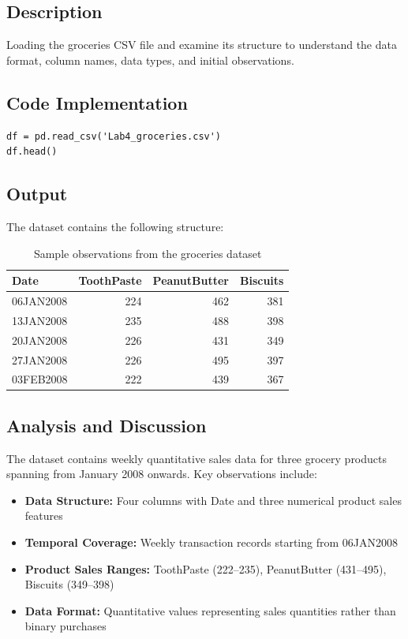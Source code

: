 \documentclass[12pt,a4paper]{article}
\begin{document}
\subsection{Description}
Loading the groceries CSV file and examine its structure to understand the data format, column names, data types, and initial observations.

\subsection{Code Implementation}

\begin{lstlisting}
df = pd.read_csv('Lab4_groceries.csv')
df.head()
\end{lstlisting}

\subsection{Output}
The dataset contains the following structure:
\begin{table}[H]
\centering
\small
\begin{tabular}{l|r|r|r}
\toprule
\textbf{Date} & \textbf{ToothPaste} & \textbf{PeanutButter} & \textbf{Biscuits} \\
\midrule
06JAN2008 & 224 & 462 & 381 \\
13JAN2008 & 235 & 488 & 398 \\
20JAN2008 & 226 & 431 & 349 \\
27JAN2008 & 226 & 495 & 397 \\
03FEB2008 & 222 & 439 & 367 \\
\bottomrule
\end{tabular}
\caption{Sample observations from the groceries dataset}
\end{table}

\subsection{Analysis and Discussion}
The dataset contains weekly quantitative sales data for three grocery products spanning from January 2008 onwards. Key observations include:

\begin{itemize}
    \item \textbf{Data Structure:} Four columns with Date and three numerical product sales features
    \item \textbf{Temporal Coverage:} Weekly transaction records starting from 06JAN2008
    \item \textbf{Product Sales Ranges:} ToothPaste (222--235), PeanutButter (431--495), Biscuits (349--398)
    \item \textbf{Data Format:} Quantitative values representing sales quantities rather than binary purchases
\end{itemize}
\end{document}

